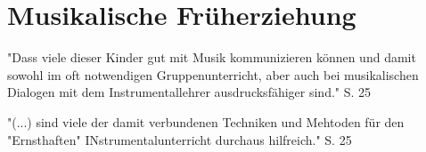 \section{Musikalische Früherziehung}

"Dass viele dieser Kinder gut mit Musik kommunizieren können und damit sowohl im
oft notwendigen Gruppenunterricht, aber auch bei musikalischen Dialogen mit dem
Instrumentallehrer ausdrucksfähiger sind." S. 25

"(...) sind viele der damit verbundenen Techniken und Mehtoden für den
"Ernsthaften" INstrumentalunterricht durchaus hilfreich." S. 25
